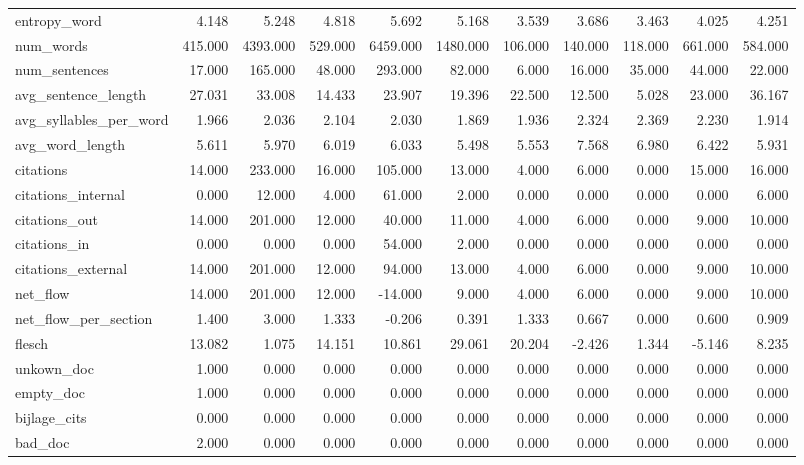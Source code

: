 \begin{tabular}{lrrrrrrrrrr}
\cline{1-11}
entropy\_word & 4.148 & 5.248 & 4.818 & 5.692 & 5.168 & 3.539 & 3.686 & 3.463 & 4.025 & 4.251 \\
\cline{1-11}
num\_words & 415.000 & 4393.000 & 529.000 & 6459.000 & 1480.000 & 106.000 & 140.000 & 118.000 & 661.000 & 584.000 \\
\cline{1-11}
num\_sentences & 17.000 & 165.000 & 48.000 & 293.000 & 82.000 & 6.000 & 16.000 & 35.000 & 44.000 & 22.000 \\
\cline{1-11}
avg\_sentence\_length & 27.031 & 33.008 & 14.433 & 23.907 & 19.396 & 22.500 & 12.500 & 5.028 & 23.000 & 36.167 \\
\cline{1-11}
avg\_syllables\_per\_word & 1.966 & 2.036 & 2.104 & 2.030 & 1.869 & 1.936 & 2.324 & 2.369 & 2.230 & 1.914 \\
\cline{1-11}
avg\_word\_length & 5.611 & 5.970 & 6.019 & 6.033 & 5.498 & 5.553 & 7.568 & 6.980 & 6.422 & 5.931 \\
\cline{1-11}
citations & 14.000 & 233.000 & 16.000 & 105.000 & 13.000 & 4.000 & 6.000 & 0.000 & 15.000 & 16.000 \\
\cline{1-11}
citations\_internal & 0.000 & 12.000 & 4.000 & 61.000 & 2.000 & 0.000 & 0.000 & 0.000 & 0.000 & 6.000 \\
\cline{1-11}
citations\_out & 14.000 & 201.000 & 12.000 & 40.000 & 11.000 & 4.000 & 6.000 & 0.000 & 9.000 & 10.000 \\
\cline{1-11}
citations\_in & 0.000 & 0.000 & 0.000 & 54.000 & 2.000 & 0.000 & 0.000 & 0.000 & 0.000 & 0.000 \\
\cline{1-11}
citations\_external & 14.000 & 201.000 & 12.000 & 94.000 & 13.000 & 4.000 & 6.000 & 0.000 & 9.000 & 10.000 \\
\cline{1-11}
net\_flow & 14.000 & 201.000 & 12.000 & -14.000 & 9.000 & 4.000 & 6.000 & 0.000 & 9.000 & 10.000 \\
\cline{1-11}
net\_flow\_per\_section & 1.400 & 3.000 & 1.333 & -0.206 & 0.391 & 1.333 & 0.667 & 0.000 & 0.600 & 0.909 \\
\cline{1-11}
flesch & 13.082 & 1.075 & 14.151 & 10.861 & 29.061 & 20.204 & -2.426 & 1.344 & -5.146 & 8.235 \\
\cline{1-11}
unkown\_doc & 1.000 & 0.000 & 0.000 & 0.000 & 0.000 & 0.000 & 0.000 & 0.000 & 0.000 & 0.000 \\
\cline{1-11}
empty\_doc & 1.000 & 0.000 & 0.000 & 0.000 & 0.000 & 0.000 & 0.000 & 0.000 & 0.000 & 0.000 \\
\cline{1-11}
bijlage\_cits & 0.000 & 0.000 & 0.000 & 0.000 & 0.000 & 0.000 & 0.000 & 0.000 & 0.000 & 0.000 \\
\cline{1-11}
bad\_doc & 2.000 & 0.000 & 0.000 & 0.000 & 0.000 & 0.000 & 0.000 & 0.000 & 0.000 & 0.000 \\
\cline{1-11}
\bottomrule
\end{tabular}
